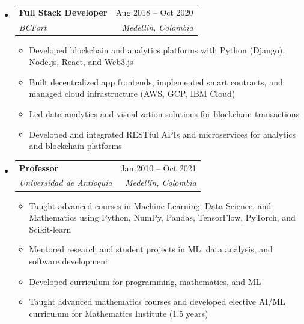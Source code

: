 \documentclass[letterpaper,11pt]{article}
\makeatletter
\newcommand{\resumeSubheading}[4]{
  \vspace{-2pt}
  \item[]
  \begin{tabular*}{\textwidth}{@{\extracolsep{\fill}}l r}
    \textbf{#1} & #2 \\
    \textit{#3} & \textit{#4} \\
  \end{tabular*}
  \vspace{-5pt}
}
\makeatother
\begin{document}
\begin{itemize}[leftmargin=0pt, itemindent=0pt, label={}, itemsep=1pt]
\resumeSubheading
{Full Stack Developer}{Aug 2018 -- Oct 2020}
{BCFort}{Medellín, Colombia}
\begin{itemize}[leftmargin=*, itemsep=0pt]
    \item Developed blockchain and analytics platforms with Python (Django), Node.js, React, and Web3.js
    \item Built decentralized app frontends, implemented smart contracts, and managed cloud infrastructure (AWS, GCP, IBM Cloud)
    \item Led data analytics and visualization solutions for blockchain transactions
    \item Developed and integrated RESTful APIs and microservices for analytics and blockchain platforms
\end{itemize}

\resumeSubheading
{Professor}{Jan 2010 -- Oct 2021}
{Universidad de Antioquia}{Medellín, Colombia}
\begin{itemize}[leftmargin=*, itemsep=0pt]
    \item Taught advanced courses in Machine Learning, Data Science, and Mathematics using Python, NumPy, Pandas, TensorFlow, PyTorch, and Scikit-learn
    \item Mentored research and student projects in ML, data analysis, and software development
    \item Developed curriculum for programming, mathematics, and ML
    \item Taught advanced mathematics courses and developed elective AI/ML curriculum for Mathematics Institute (1.5 years)
\end{itemize}
\end{itemize}
\end{document}
